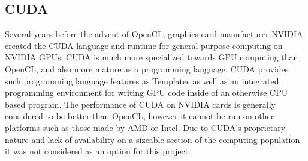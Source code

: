 \subsection{CUDA}
Several years before the advent of OpenCL, graphics card manufacturer NVIDIA created the CUDA
language and runtime for general purpose computing on NVIDIA GPUs. CUDA is much
more specialized towards GPU computing than OpenCL, and also more mature as a
programming language. CUDA provides such programming language features as
Templates as well as an integrated programming environment for writing GPU code
inside of an otherwise CPU based program. The performance of CUDA on NVIDIA
cards is generally considered to be better than OpenCL, however it cannot be
run on other platforms such as those made by AMD or Intel. Due to CUDA's
proprietary nature and lack of availability on a sizeable section of the
computing population it was not considered as an option for this project.




